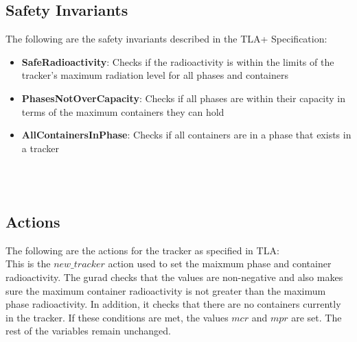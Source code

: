 \subsection{Safety Invariants}

The following are the safety invariants described in the TLA+ Specification:

\begin{itemize}
\item \textbf{SafeRadioactivity}: Checks if the radioactivity is within the limits of the tracker's maximum radiation level for all phases and containers
\item \textbf{PhasesNotOverCapacity}: Checks if all phases are within their capacity in terms of the maximum containers they can hold
\item \textbf{AllContainersInPhase}: Checks if all containers are in a phase that exists in a tracker
\end{itemize}

%
%
 \\

%
 \\
	
%

\newpage
\subsection{Actions}
The following are the actions for the tracker as specified in TLA: \\

This is the $new\_tracker$ action used to set the maixmum phase and container radioactivity. The gurad checks that the values are non-negative and also makes sure the maximum container radioactivity is not greater than the maximum phase radioactivity. In addition, it checks that there are no containers currently in the tracker. If these conditions are met, the values $mcr$ and $mpr$ are set. The rest of the variables remain unchanged.   

